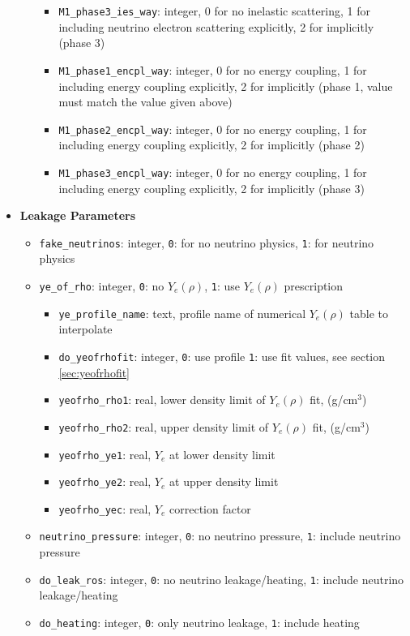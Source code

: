 \documentclass[10pt,nofootinbib]{article}
\newcommand{\code}[1]{\texttt{#1}}
\begin{document}
\begin{itemize}
\begin{itemize}
\begin{itemize}
\item{{\tt M1\_phase3\_ies\_way}: integer, 0 for no inelastic scattering, 1 for including neutrino electron scattering explicitly, 2 for implicitly (phase 3)}
\item{{\tt M1\_phase1\_encpl\_way}: integer, 0 for no energy coupling, 1 for including energy coupling explicitly, 2 for implicitly (phase 1, value must match the value given above)}
\item{{\tt M1\_phase2\_encpl\_way}: integer, 0 for no energy coupling, 1 for including energy coupling explicitly, 2 for implicitly (phase 2)}
\item{{\tt M1\_phase3\_encpl\_way}: integer, 0 for no energy coupling, 1 for including energy coupling explicitly, 2 for implicitly (phase 3)}
\end{itemize}
\end{itemize}
\item{{\bf Leakage Parameters}}
\begin{itemize}
\item{{\tt fake\_neutrinos}: integer, \code{0}: for no neutrino physics, \code{1}: for neutrino physics}
\item{{\tt ye\_of\_rho}: integer, \code{0}: no $Y_e(\rho)$, \code{1}: use $Y_e(\rho)$ prescription}
\begin{itemize}
\item{{\tt ye\_profile\_name}: text, profile name of numerical $Y_e(\rho)$ table to interpolate}
\item{{\tt do\_yeofrhofit}: integer, \code{0}: use profile \code{1}: use fit values, see section \ref{sec:yeofrhofit}}
\item{{\tt yeofrho\_rho1}: real, lower density limit of $Y_e(\rho)$ fit, (g/cm$^3$)}
\item{{\tt yeofrho\_rho2}: real, upper density limit of $Y_e(\rho)$ fit, (g/cm$^3$)}
\item{{\tt yeofrho\_ye1}: real, $Y_e$ at lower density limit}
\item{{\tt yeofrho\_ye2}: real, $Y_e$ at upper density limit}
\item{{\tt yeofrho\_yec}: real, $Y_e$ correction factor}
\end{itemize}
\item{{\tt neutrino\_pressure}: integer, \code{0}: no neutrino pressure, \code{1}: include neutrino pressure}
\item{{\tt do\_leak\_ros}: integer, \code{0}: no neutrino leakage/heating, \code{1}: include neutrino leakage/heating}
\item{{\tt do\_heating}: integer, \code{0}: only neutrino leakage, \code{1}: include heating}

\end{itemize}
\end{itemize}
\end{document}
